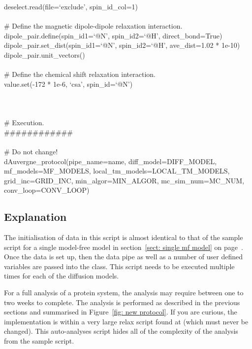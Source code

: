 \begin{htmlonly}
\begin{htmlonly}
\begin{exampleenv}
deselect.read(file=`exclude', spin\_id\_col=1) \\
 \\
\# Define the magnetic dipole-dipole relaxation interaction. \\
dipole\_pair.define(spin\_id1=`@N', spin\_id2=`@H', direct\_bond=True) \\
dipole\_pair.set\_dist(spin\_id1=`@N', spin\_id2=`@H', ave\_dist=1.02 * 1e-10) \\
dipole\_pair.unit\_vectors() \\
 \\
\# Define the chemical shift relaxation interaction. \\
value.set(-172 * 1e-6, `csa', spin\_id=`@N') \\
 \\
 \\
 \\
\# Execution. \\
\#\#\#\#\#\#\#\#\#\#\#\# \\
 \\
\# Do not change! \\
dAuvergne\_protocol(pipe\_name=name, diff\_model=DIFF\_MODEL, mf\_models=MF\_MODELS, local\_tm\_models=LOCAL\_TM\_MODELS, grid\_inc=GRID\_INC, min\_algor=MIN\_ALGOR, mc\_sim\_num=MC\_NUM, conv\_loop=CONV\_LOOP) \\
\end{exampleenv}



\subsection{Explanation}

The initialisation of data in this script is almost identical to that of the sample script for a single model-free model in section~\ref{sect: single mf model} on page~\pageref{sect: single mf model}.  Once the data is set up, then the data pipe as well as a number of user defined variables are passed into the  class.  This script needs to be executed multiple times for each of the diffusion models.

For a full analysis of a protein system, the analysis may require between one to two weeks to complete.  The analysis is performed as described in the previous sections and summarised in Figure~\ref{fig: new protocol}.  If you are curious, the implementation is within a very large relax script found at  (which must never be changed).  This auto-analyses script hides all of the complexity of the analysis from the sample script.




\end{htmlonly}
\end{htmlonly}
